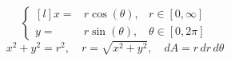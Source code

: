 \begin{equation*}
    \left\{
    \begin{matrix*}[l]
        x = & r\cos(\theta), & r\in [0,\infty]\\
        y = & r\sin(\theta), & \theta\in [0,2\pi]
    \end{matrix*}
    \right.
\end{equation*}
\[ x^2+y^2=r^2,\quad r=\sqrt{x^2+y^2}, \quad dA = r\,dr\,d\theta\]
